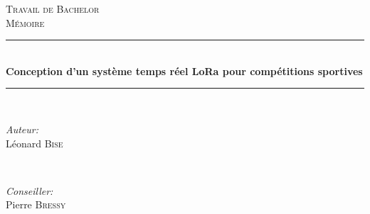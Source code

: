 \begin{titlepage}

\newcommand{\HRule}{\rule{\linewidth}{0.5mm}} %

\center %
 


\vspace{3cm}

\textsc{\Large Travail de Bachelor}\\[0.5cm] %
\textsc{\large Mémoire}\\[0.5cm] %


\HRule \\[0.4cm]
{ \huge \bfseries Conception d'un système temps réel LoRa pour compétitions sportives}\\[0.4cm] %
\HRule \\[1.5cm]
 

\begin{minipage}{0.4\textwidth}
\begin{flushleft} \large
\emph{Auteur:}\\
Léonard \textsc{Bise} %
\end{flushleft}
\end{minipage}
~
\begin{minipage}{0.4\textwidth}
\begin{flushright} \large
\emph{Conseiller:} \\
Pierre \textsc{Bressy} %
\end{flushright}
\end{minipage}\\[2cm]


\end{titlepage}
